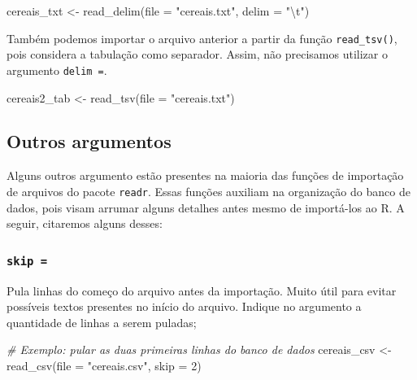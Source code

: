 \documentclass[
  brazilian,
]{book}
\newenvironment{Shaded}{\begin{snugshade}}{\end{snugshade}}
\newcommand{\AttributeTok}[1]{\textcolor[rgb]{0.77,0.63,0.00}{#1}}
\newcommand{\CommentTok}[1]{\textcolor[rgb]{0.56,0.35,0.01}{\textit{#1}}}
\newcommand{\DecValTok}[1]{\textcolor[rgb]{0.00,0.00,0.81}{#1}}
\newcommand{\FunctionTok}[1]{\textcolor[rgb]{0.00,0.00,0.00}{#1}}
\newcommand{\NormalTok}[1]{#1}
\newcommand{\OtherTok}[1]{\textcolor[rgb]{0.56,0.35,0.01}{#1}}
\newcommand{\SpecialCharTok}[1]{\textcolor[rgb]{0.00,0.00,0.00}{#1}}
\newcommand{\StringTok}[1]{\textcolor[rgb]{0.31,0.60,0.02}{#1}}
\begin{document}
\begin{Shaded}
\begin{Highlighting}[]
\NormalTok{cereais\_txt }\OtherTok{\textless{}{-}} \FunctionTok{read\_delim}\NormalTok{(}\AttributeTok{file =} \StringTok{"cereais.txt"}\NormalTok{, }\AttributeTok{delim =} \StringTok{"}\SpecialCharTok{\textbackslash{}t}\StringTok{"}\NormalTok{)}
\end{Highlighting}
\end{Shaded}

Também podemos importar o arquivo anterior a partir da função \texttt{read\_tsv()}, pois considera a tabulação como separador. Assim, não precisamos utilizar o argumento \texttt{delim\ =}.

\begin{Shaded}
\begin{Highlighting}[]
\NormalTok{cereais2\_tab }\OtherTok{\textless{}{-}} \FunctionTok{read\_tsv}\NormalTok{(}\AttributeTok{file =} \StringTok{"cereais.txt"}\NormalTok{)}
\end{Highlighting}
\end{Shaded}

\hypertarget{readrgs}{%
\subsection{Outros argumentos}\label{readrgs}}

Alguns outros argumento estão presentes na maioria das funções de importação de arquivos do pacote \texttt{readr}. Essas funções auxiliam na organização do banco de dados, pois visam arrumar alguns detalhes antes mesmo de importá-los ao R. A seguir, citaremos alguns desses:

\hypertarget{skip}{%
\subsubsection*{\texorpdfstring{\texttt{skip\ =}}{skip =}}\label{skip}}

Pula linhas do começo do arquivo antes da importação. Muito útil para evitar possíveis textos presentes no início do arquivo. Indique no argumento a quantidade de linhas a serem puladas;

\begin{Shaded}
\begin{Highlighting}[]
\CommentTok{\# Exemplo: pular as duas primeiras linhas do banco de dados}
\NormalTok{cereais\_csv }\OtherTok{\textless{}{-}} \FunctionTok{read\_csv}\NormalTok{(}\AttributeTok{file =} \StringTok{"cereais.csv"}\NormalTok{,}
                        \AttributeTok{skip =} \DecValTok{2}\NormalTok{)}
\end{Highlighting}
\end{Shaded}
\end{document}
